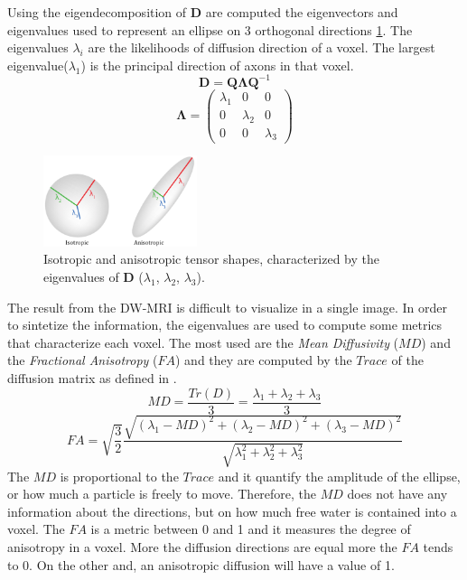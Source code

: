  Using the eigendecomposition of $\mathbf{D}$ are computed the eigenvectors and eigenvalues used to represent an ellipse on 3 orthogonal directions \ref{fig:elipse}. The eigenvalues $\lambda_{i}$ are the likelihoods of diffusion direction of a voxel. The largest eigenvalue($\lambda_1$) is the principal direction of axons in that voxel.
 \[\mathbf{D}=\mathbf{Q}\mathbf{\Lambda}\mathbf{Q}^{-1}\]
 \begin{equation}
    \mathbf{\Lambda} = 
    \begin{pmatrix}
        \lambda_{1} & 0 & 0 \\
        0 & \lambda_{2} & 0 \\
        0 & 0 & \lambda_{3}
    \end{pmatrix}
 \end{equation}

 \begin{figure}[h]
    \centering
    \includegraphics[width=0.4\textwidth]{images/ellipses.png}
    \caption{Isotropic and anisotropic tensor shapes, characterized by the eigenvalues of $\mathbf{D}$ ($\lambda_1$, $\lambda_2$, $\lambda_3$). \cite{ellipsoidDTI}}
    \label{fig:elipse}
 \end{figure}

 The result from the DW-MRI is difficult to visualize in a single image. In order to sintetize the information, the eigenvalues are used to compute some metrics that characterize each voxel. The most used are the \emph{Mean Diffusivity} ($MD$) and the \emph{Fractional Anisotropy} ($FA$) and they are computed by the $Trace$ of the diffusion matrix as defined in \cite{dtiBook}.
 \begin{equation}
    {MD} = \frac{{Tr}(D)}{3} = \frac{\lambda_1 + \lambda_2 + \lambda_3}{3}
 \end{equation}
 \begin{equation}
    FA = \sqrt{\frac{3}{2}}\frac{\sqrt{(\lambda_1-MD)^2+(\lambda_2-MD)^2+(\lambda_3-MD)^2}}{\sqrt{\lambda_1^2+\lambda_2^2+\lambda_3^2}}
 \end{equation}
 The $MD$ is proportional to the $Trace$ and it quantify the amplitude of the ellipse, or how much a particle is freely to move. Therefore, the $MD$ does not have any information about the directions, but on how much free water is contained into a voxel. The $FA$ is a metric between 0 and 1 and it measures the degree of anisotropy in a voxel. More the diffusion directions are equal more the $FA$ tends to 0. On the other and, an anisotropic diffusion will have a value of 1.
 
